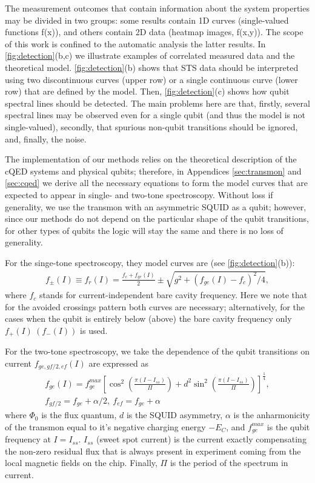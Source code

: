 \documentclass[%
 aip,
 amsmath,amssymb,
 reprint,%
]{revtex4-1}
\begin{document}
The measurement outcomes that contain information about the system properties may be divided in two groups: some results contain 1D curves (single-valued functions f(x)), and others contain 2D data (heatmap images, f(x,y)). The scope of this work is confined to the automatic analysis the latter results. In \autoref{fig:detection}(b,c) we illustrate examples of correlated measured data and the theoretical model. \autoref{fig:detection}(b) shows that STS data should be interpreted using two discontinuous curves (upper row) or a single continuous curve (lower row) that are defined by the model. Then, \autoref{fig:detection}(c) shows how qubit spectral lines should be detected. The main problems here are that, firstly, several spectral lines may be observed even for a single qubit (and thus the model is not single-valued), secondly, that spurious non-qubit transitions should be ignored, and, finally, the noise.

The implementation of our methods relies on the theoretical description of the cQED systems and physical qubits; therefore, in Appendices \ref{sec:transmon} and \ref{sec:cqed} we derive all the necessary equations to form the model curves that are expected to appear in single- and two-tone spectroscopy. Without loss if generality, we use the transmon\cite{koch2007} with an asymmetric SQUID as a qubit; however, since our methods do not depend on the particular shape of the qubit transitions, for other types of qubits the logic will stay the same and there is no loss of generality.

For the singe-tone spectroscopy, they model curves are (see \autoref{fig:detection}(b)):
\begin{align}
f_\pm(I) \equiv f_r(I) = \frac{f_c + f_{ge}(I)}{2} \pm \sqrt{g^2+(f_{ge}(I) - f_c)^2/4},\label{eq:f_r}
\end{align}
where $f_c$ stands for current-independent bare cavity frequency. Here we note that for the avoided crossings pattern both curves are necessary; alternatively, for the cases when the qubit is entirely below (above) the bare cavity frequency only $ f_+(I)\ \left(f_-(I)\right)$ is used. 

For the two-tone spectroscopy, we take the dependence of the qubit transitions on current $f_{ge, gf/2, ef}(I)$ are expressed as
\begin{equation}
\begin{gathered}
f_{ge}(I) = f_{ge}^{max} \left[\cos^2\left(\frac{\pi(I-I_{ss})}{\Pi}\right)+d^2 \sin^2 \left(\frac{\pi(I-I_{ss})}{\Pi}\right)\right]^\frac{1}{4}, \\
f_{gf/2} = f_{ge} + \alpha/2,\ f_{ef}=f_{ge} + \alpha
\end{gathered}\label{eq:tr_spectrum}
\end{equation}
where $\Phi_0$ is the flux quantum, $d$ is the SQUID asymmetry, $\alpha$ is the anharmonicity of the transmon equal to it's negative charging energy $-E_C$, and $f_{ge}^{max}$ is the qubit frequency at $I = I_{ss}$. $I_{ss}$ (sweet spot current) is the current exactly compensating the non-zero residual flux that is always present in experiment coming from the local magnetic fields on the chip. Finally, $\Pi$ is the period of the spectrum in current.
\end{document}
